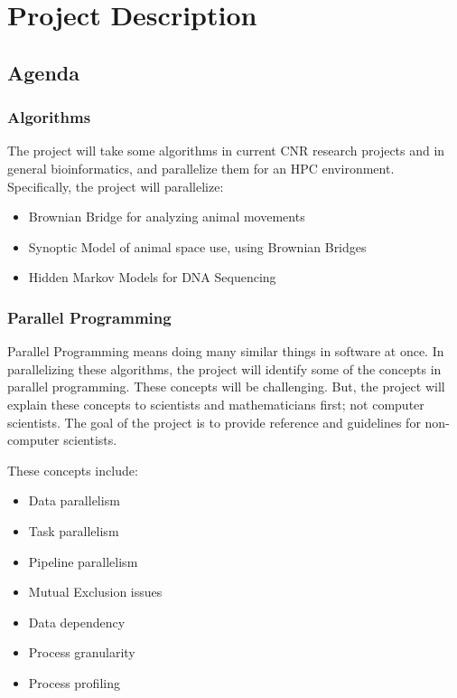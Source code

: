 

\section{Project Description}

\subsection{Agenda}

\subsubsection{Algorithms}

The project will take some algorithms in current CNR research projects and in
general bioinformatics, and parallelize them for an HPC environment.
Specifically, the project will parallelize:
\begin{itemize}
	\item Brownian Bridge for analyzing animal movements \cite{bb}
	\item Synoptic Model of animal space use, using Brownian Bridges 
		\cite{syn}
	\item Hidden Markov Models for DNA Sequencing
\end{itemize}

\subsubsection{Parallel Programming}

Parallel Programming means doing many similar things in software at once.
In parallelizing these algorithms, the project will identify some of the
concepts in parallel programming. These concepts will be challenging. But,
the project will explain these concepts to scientists and mathematicians first;
not computer scientists. The goal of the project is to provide reference and
guidelines for non-computer scientists. 

These concepts include:
\begin{itemize}
	\item Data parallelism
	\item Task parallelism
	\item Pipeline parallelism
	\item Mutual Exclusion issues
	\item Data dependency
	\item Process granularity
	\item Process profiling
\end{itemize}

